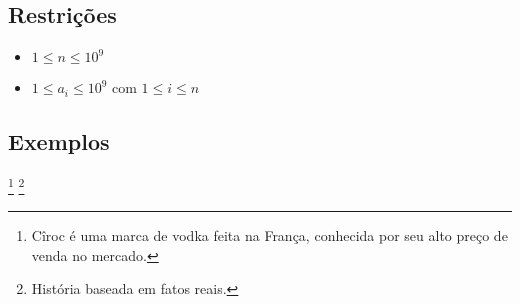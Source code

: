 \subsection*{Restrições}
\begin{itemize}
  \item $1 \leq n \leq 10^9$
  \item $1 \leq a_i \leq 10^9$ com $1 \leq i \leq n$
\end{itemize}

\subsection*{Exemplos}


\footnote{Cîroc é uma marca de vodka feita na França, conhecida por seu alto preço de venda no mercado.}
\footnote{História baseada em fatos reais.}

